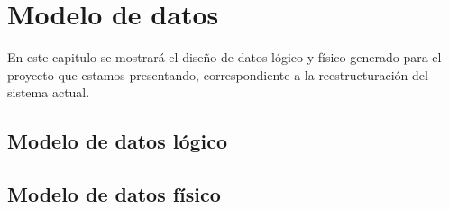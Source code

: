 \chapter{Modelo de datos}
\label{cap:modelo}
En este capitulo se mostrará el diseño de datos lógico y físico generado para el proyecto que estamos presentando, correspondiente a la reestructuración del sistema actual. 

\section{Modelo de datos lógico}

\section{Modelo de datos físico}

\cleardoublepage

